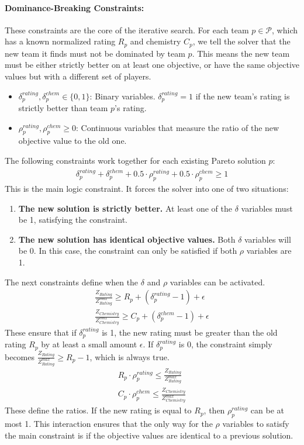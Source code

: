 \documentclass{article}
\begin{document}
\paragraph{Dominance-Breaking Constraints:} These constraints are the core of the iterative search. For each team $p \in \mathcal{P}$, which has a known normalized rating $R_p$ and chemistry $C_p$, we tell the solver that the new team it finds must not be dominated by team $p$. This means the new team must be either strictly better on at least one objective, or have the same objective values but with a different set of players.
\begin{itemize}
    \item $\delta^{rating}_p, \delta^{chem}_p \in \{0, 1\}$: Binary variables. $\delta^{rating}_p=1$ if the new team's rating is strictly better than team $p$'s rating.
    \item $\rho^{rating}_p, \rho^{chem}_p \ge 0$: Continuous variables that measure the ratio of the new objective value to the old one.
\end{itemize}
The following constraints work together for each existing Pareto solution $p$:
\begin{gather}
    \delta^{rating}_p + \delta^{chem}_p + 0.5 \cdot \rho^{rating}_p + 0.5 \cdot \rho^{chem}_p \ge 1
\end{gather}
This is the main logic constraint. It forces the solver into one of two situations:
\begin{enumerate}
    \item \textbf{The new solution is strictly better.} At least one of the $\delta$ variables must be 1, satisfying the constraint.
    \item \textbf{The new solution has identical objective values.} Both $\delta$ variables will be 0. In this case, the constraint can only be satisfied if both $\rho$ variables are 1.
\end{enumerate}
The next constraints define when the $\delta$ and $\rho$ variables can be activated.
\begin{gather}
    \frac{Z_{Rating}}{Z_{Rating}^{max}} \ge R_p + (\delta^{rating}_p - 1) + \epsilon \\
    \frac{Z_{Chemistry}}{Z_{Chemistry}^{max}} \ge C_p + (\delta^{chem}_p - 1) + \epsilon
\end{gather}
These ensure that if $\delta^{rating}_p$ is 1, the new rating must be greater than the old rating $R_p$ by at least a small amount $\epsilon$. If $\delta^{rating}_p$ is 0, the constraint simply becomes $\frac{Z_{Rating}}{Z_{Rating}^{max}} \ge R_p - 1$, which is always true.
\begin{gather}
    R_p \cdot \rho^{rating}_p \le \frac{Z_{Rating}}{Z_{Rating}^{max}} \\
    C_p \cdot \rho^{chem}_p \le \frac{Z_{Chemistry}}{Z_{Chemistry}^{max}}
\end{gather}
These define the ratios. If the new rating is equal to $R_p$, then $\rho^{rating}_p$ can be at most 1. This interaction ensures that the only way for the $\rho$ variables to satisfy the main constraint is if the objective values are identical to a previous solution.
\end{document}
